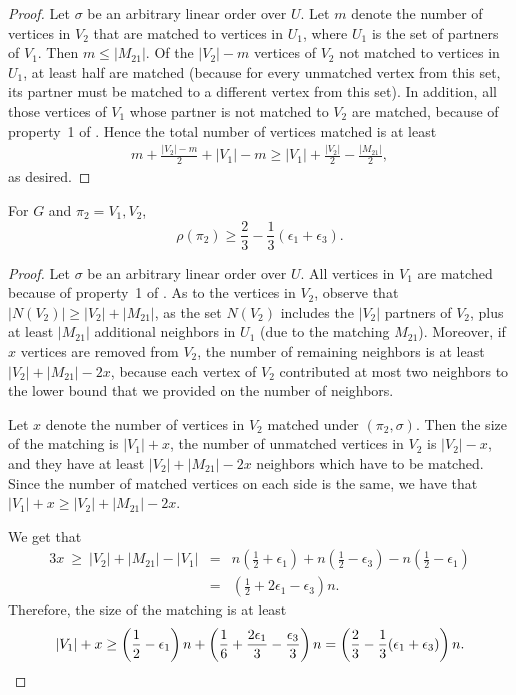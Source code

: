 \begin{proof}
	Let $\sigma$ be an arbitrary linear order over $U$. Let $m$ denote the number of vertices in $V_2$ that are matched to vertices in $U_1$, where $U_1$ is the set of partners of $V_1$.
	Then $m \le |M_{21}|$. Of the $|V_2| - m$ vertices of $V_2$ not matched to vertices in $U_1$, at least half are matched (because for every unmatched vertex from this set, its partner must be matched to a different vertex from this set). In addition, all those vertices of $V_1$ whose partner is not matched to $V_2$ are matched, because of property~1 of . Hence the total number of vertices matched is at least 
	\begin{eqnarray}
m + \frac{|V_2| - m}{2} + |V_1| - m \ge |V_1|+\frac{|V_2|}{2} - \frac{|M_{21}|}{2},
	\end{eqnarray}
	as desired.
\end{proof}

\begin{lemma}
	\label{lem:largeM21}
	For $G$ and $\pi_2 = V_1,V_2$,
$$\rho(\pi_2) \ge \frac{2}{3} - \frac{1}{3}(\epsilon_1 + \epsilon_3).$$
\end{lemma}

\begin{proof}
	Let $\sigma$ be an arbitrary linear order over $U$. All vertices in $V_1$ are matched because of property~1 of . As to the vertices in $V_2$, observe that $|N(V_2)| \ge |V_2| + |M_{21}|$, as the set $N(V_2)$ includes the $|V_2|$ partners of $V_2$, plus at least $|M_{21}|$ additional neighbors in $U_1$ (due to the matching $M_{21}$). Moreover, if $x$ vertices are removed from $V_2$, the number of remaining neighbors is at least $|V_2| + |M_{21}| - 2x$, because each vertex of $V_2$ contributed at most two neighbors to the lower bound that we provided on the number of neighbors.
	
	Let $x$ denote the number of vertices in $V_2$ matched under $(\pi_2,\sigma)$.
	Then the size of the matching is $|V_1| + x$, the number of unmatched vertices in $V_2$ is $|V_2|-x$, and they have at least $|V_2| + |M_{21}| - 2x$ neighbors which have to be matched. Since the number of matched vertices on each side is the same, %
	we have that $|V_1| + x \ge |V_2| + |M_{21}| - 2x$.
	
	
	We get that
	\begin{eqnarray}
		3x \  \geq \  |V_2|+|M_{21}|-|V_1|
		& = & n\left(\frac{1}{2}+\epsilon_1\right)+n\left(\frac{1}{2}-\epsilon_3\right)-n\left(\frac{1}{2}-\epsilon_1\right)\\
		& = & \left(\frac{1}{2} + 2\epsilon_1 - \epsilon_3\right)n.
	\end{eqnarray}
	Therefore, the size of the matching is at least
	\begin{eqnarray}
	|V_1| + x \geq \left( \frac{1}{2} - \epsilon_1\right)n + \left(\frac{1}{6} + \frac{2\epsilon_1}{3} - \frac{\epsilon_3}{3}\right)n = \left(\frac{2}{3} - \frac{1}{3}(\epsilon_1 + \epsilon_3)\right) n.    \qedhere
	\end{eqnarray}
\end{proof}

